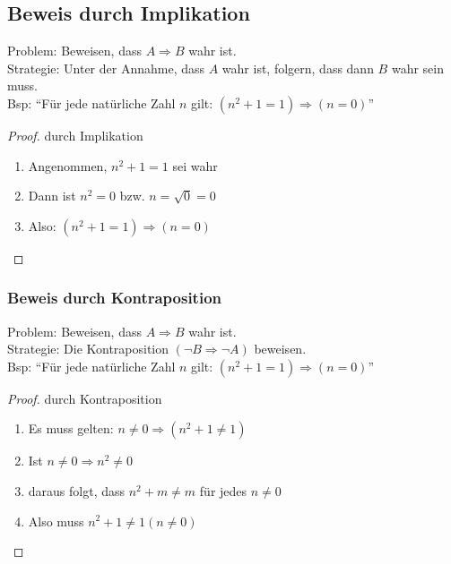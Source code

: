 \subsection{Beweis durch Implikation}
Problem: Beweisen, dass $A \Rightarrow B$ wahr ist.\\
Strategie: Unter der Annahme, dass $A$ wahr ist, folgern, dass dann $B$ wahr sein muss.\\
Bsp: \enquote{Für jede natürliche Zahl $n$ gilt: $(n^2 + 1 = 1) \Rightarrow (n = 0)$}\\
\begin{proof}
durch Implikation
\begin{enumerate}\itemsep0em
	\item Angenommen, $n^2 + 1 = 1$ sei wahr
	\item Dann ist $n^2 = 0$ bzw. $n = \sqrt{0} = 0$
	\item Also: $(n^2 + 1 = 1) \Rightarrow (n = 0)$\qedhere
\end{enumerate}
\end{proof}

\subsubsection{Beweis durch Kontraposition}
Problem: Beweisen, dass $A \Rightarrow B$ wahr ist.\\
Strategie: Die Kontraposition $(\neg B \Rightarrow \neg A)$ beweisen.\\
Bsp: \enquote{Für jede natürliche Zahl $n$ gilt: $(n^2 + 1 = 1) \Rightarrow (n = 0)$}\\
\begin{proof}
durch Kontraposition
\begin{enumerate}\itemsep0em
	\item Es muss gelten: $n \neq 0 \Rightarrow (n^2 + 1 \neq 1)$
	\item Ist $n \neq 0 \Rightarrow n^2 \neq 0$
	\item daraus folgt, dass $n^2 + m \neq m$ für jedes $n \neq 0$
	\item Also muss $n^2 + 1 \neq 1 (n \neq 0)$\qedhere
\end{enumerate}
\end{proof}

